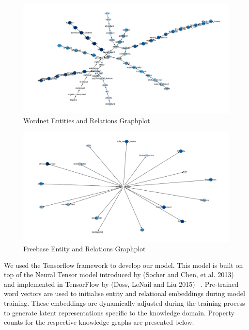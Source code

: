 \begin{figure}[H]
   	\centering
    	\includegraphics[width=\textwidth]{Wordnet}
	\caption{Wordnet Entities and Relations Graphplot}
\end{figure}

\begin{figure}[H]
   	\centering
    	\includegraphics[width=\textwidth]{Freebase}
	\caption{Freebase Entity and Relations Graphplot}
\end{figure}

\noindent We used the Tensorflow framework to develop our model.  This model is built on top of the Neural Tensor model introduced by (Socher and Chen, et al. 2013) \unskip ~\citep{socher2013reasoning} and implemented in TensorFlow by (Doss, LeNail and Liu 2015) \unskip ~\citep{Doss2015}. Pre-trained word vectors are used to initialise entity and relational embeddings during model training. These embeddings are dynamically adjusted during the training process to generate latent representations specific to the knowledge domain. Property counts for the respective knowledge graphs are presented below:

\bigskip

